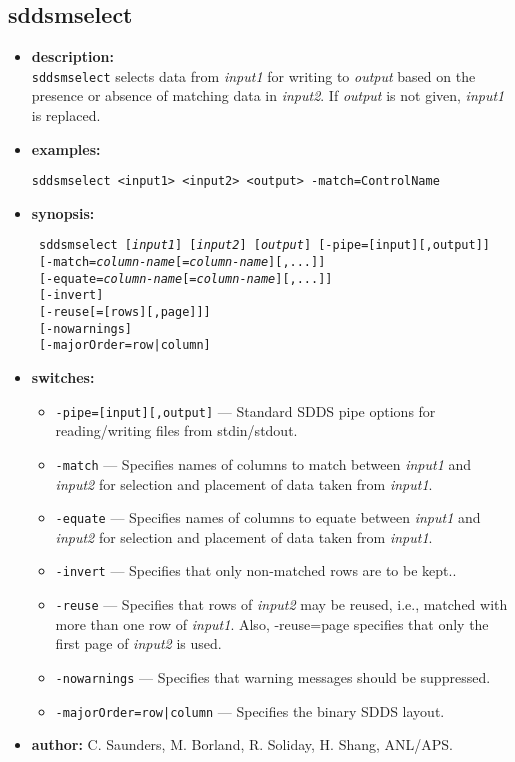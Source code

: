 \newpage 
\subsection{sddsmselect} 
\label{sddsmselect} 
 
\begin{itemize} 
\item {\bf description:} \hspace*{1mm}\\ 
{\tt sddsmselect} selects data from {\em input1} for writing to {\em output} based on the presence or absence of matching data in {\em input2}. If {\em output} is not given, {\em input1} is replaced.
\item {\bf examples:} 
\begin{flushleft}
{\tt sddsmselect <input1> <input2> <output> -match=ControlName }
\end{flushleft} 
\item {\bf synopsis:}  
\begin{flushleft}
{\tt 
sddsmselect [{\em input1}] [{\em input2}] [{\em output}] [-pipe=[input][,output]] \\ \
{}[-match={\em column-name}[={\em column-name}][,...]] \\ \
{}[-equate={\em column-name}[={\em column-name}][,...]] \\ \
{}[-invert] \\ \
{}[-reuse[=[rows][,page]]] \\ \
{}[-nowarnings] \\ \
{}[-majorOrder=row|column]}
\end{flushleft} 
\item {\bf switches:} 
    \begin{itemize} 
    \item {\tt -pipe=[input][,output]} --- Standard SDDS pipe options for reading/writing files from stdin/stdout.
    \item {\tt -match} --- Specifies names of columns to match between {\em input1} and {\em input2} for selection and placement of data taken from {\em input1}.
    \item {\tt -equate} --- Specifies names of columns to equate between {\em input1} and {\em input2} for selection and placement of data taken from {\em input1}.
    \item {\tt -invert} --- Specifies that only non-matched rows are to be kept..
    \item {\tt -reuse} --- Specifies that rows of {\em input2} may be reused, i.e., matched with more than one row of {\em input1}.  Also, -reuse=page specifies that only the first page of {\em input2} is used.
    \item {\tt -nowarnings} --- Specifies that warning messages should be suppressed.
    \item {\tt -majorOrder=row|column} --- Specifies the binary SDDS layout.
\end{itemize} 

\item {\bf author:} C. Saunders, M. Borland, R. Soliday, H. Shang, ANL/APS. 
\end{itemize} 
